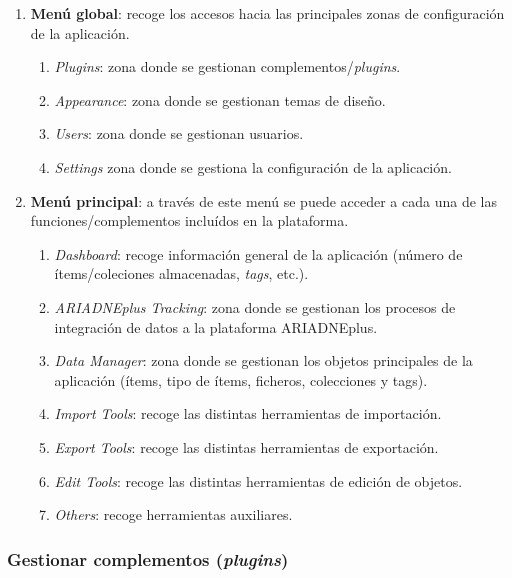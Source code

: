 \documentclass[
]{article}
\providecommand{\tightlist}{%
  \setlength{\itemsep}{0pt}\setlength{\parskip}{0pt}}
\begin{document}
\begin{enumerate}
\def\labelenumi{\arabic{enumi}.}
\tightlist
\item
  \textbf{Menú global}: recoge los accesos hacia las principales zonas
  de configuración de la aplicación.

  \begin{enumerate}
  \def\labelenumii{\alph{enumii}.}
  \tightlist
  \item
    \emph{Plugins}: zona donde se gestionan complementos/\emph{plugins}.
  \item
    \emph{Appearance}: zona donde se gestionan temas de diseño.
  \item
    \emph{Users}: zona donde se gestionan usuarios.
  \item
    \emph{Settings} zona donde se gestiona la configuración de la
    aplicación.
  \end{enumerate}
\item
  \textbf{Menú principal}: a través de este menú se puede acceder a cada
  una de las funciones/complementos incluídos en la plataforma.

  \begin{enumerate}
  \def\labelenumii{\alph{enumii}.}
  \tightlist
  \item
    \emph{Dashboard}: recoge información general de la aplicación
    (número de ítems/coleciones almacenadas, \emph{tags}, etc.).
  \item
    \emph{ARIADNEplus Tracking}: zona donde se gestionan los procesos de
    integración de datos a la plataforma ARIADNEplus.
  \item
    \emph{Data Manager}: zona donde se gestionan los objetos principales
    de la aplicación (ítems, tipo de ítems, ficheros, colecciones y
    tags).
  \item
    \emph{Import Tools}: recoge las distintas herramientas de
    importación.
  \item
    \emph{Export Tools}: recoge las distintas herramientas de
    exportación.
  \item
    \emph{Edit Tools}: recoge las distintas herramientas de edición de
    objetos.
  \item
    \emph{Others}: recoge herramientas auxiliares.
  \end{enumerate}
\end{enumerate}

\hypertarget{gestionar-complementos-plugins}{%
\subsubsection{\texorpdfstring{Gestionar complementos
(\emph{plugins})}{Gestionar complementos (plugins)}}\label{gestionar-complementos-plugins}}
\end{document}
